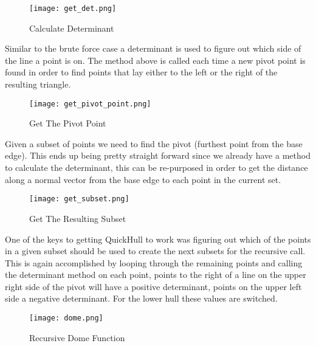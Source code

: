 \documentclass[a4paper, 12pt]{article}
\begin{document}
{  \begin{figure}[H]
  \begin{center}
    \texttt{[image: get\_det.png]}
  \end{center}
    \caption{Calculate Determinant}
    \label{fig:get_det}
  \end{figure} 

  Similar to the brute force case a determinant is used to figure out which side of the line a point is on.  The method above is called each time a new pivot point is found in order to find points that lay either to the left or the right of the resulting triangle.
  
  \begin{figure}[H]
  \begin{center}
    \texttt{[image: get\_pivot\_point.png]}
  \end{center}
    \caption{Get The Pivot Point}
    \label{fig:get_pivot}
  \end{figure}
  Given a subset of points we need to find the pivot (furthest point from the base edge). This ends up being pretty straight forward since we already have a method to calculate the determinant, this can be re-purposed in order to get the distance along a normal vector from the base edge to each point in the current set.  


  \begin{figure}[H]
  \begin{center}
    \texttt{[image: get\_subset.png]}
  \end{center}
    \caption{Get The Resulting Subset}
    \label{fig:get_subset}
  \end{figure}
One of the keys to getting QuickHull to work was figuring out which of the points in a given subset should be used to create the next subsets for the recursive call.  This is again accomplished by looping through the remaining points and calling the determinant method on each point, points to the right of a line on the upper right side of the pivot will have a positive determinant, points on the upper left side a negative determinant.  For the lower hull these values are switched.

  \begin{figure}[H]
  \begin{center}
    \texttt{[image: dome.png]}
  \end{center}
    \caption{Recursive Dome Function}
    \label{fig:dome}
  \end{figure}

}
\end{document}
